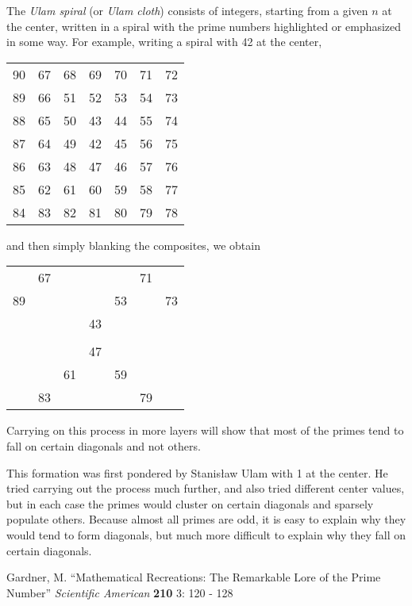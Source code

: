 \documentclass[12pt]{article}
\begin{document}
The {\em Ulam spiral} (or {\em Ulam cloth}) consists of integers, starting from a given $n$ at the center, written in a spiral with the prime numbers highlighted or emphasized in some way. For example, writing a spiral with 42 at the center,

\begin{tabular}{|c|l|l|l|l|l|l|}
90 & 67 & 68 & 69 & 70 & 71 & 72 \\
89 & 66 & 51 & 52 & 53 & 54 & 73 \\
88 & 65 & 50 & 43 & 44 & 55 & 74 \\
87 & 64 & 49 & 42 & 45 & 56 & 75 \\
86 & 63 & 48 & 47 & 46 & 57 & 76 \\
85 & 62 & 61 & 60 & 59 & 58 & 77 \\
84 & 83 & 82 & 81 & 80 & 79 & 78 \\  
\end{tabular}

and then simply blanking the composites, we obtain

\begin{tabular}{|c|l|l|l|l|l|l|}
 & 67 &  &  &  & 71 &  \\
89 &  &  &  & 53 &  & 73 \\
 &  &  & 43 &  &  &  \\
 &  & &  & & &  \\
 & & & 47 & &  &  \\
 & & 61 & & 59 & &  \\
 & 83 & & & & 79 & \\  
\end{tabular}

Carrying on this process in more layers will show that most of the primes tend to fall on certain diagonals and not others.

This formation was first pondered by Stanis\l{}aw Ulam with 1 at the center. He tried carrying out the process much further, and also tried different center values, but in each case the primes would cluster on certain diagonals and sparsely populate others. Because almost all primes are odd, it is easy to explain why they would tend to form diagonals, but much more difficult to explain why they fall on certain diagonals.

\begin{thebibliography}{1}
 Gardner, M. ``Mathematical Recreations: The Remarkable Lore of the Prime Number'' {\it Scientific American} {\bf 210} 3: 120 - 128
\end{thebibliography} 
\end{document}
